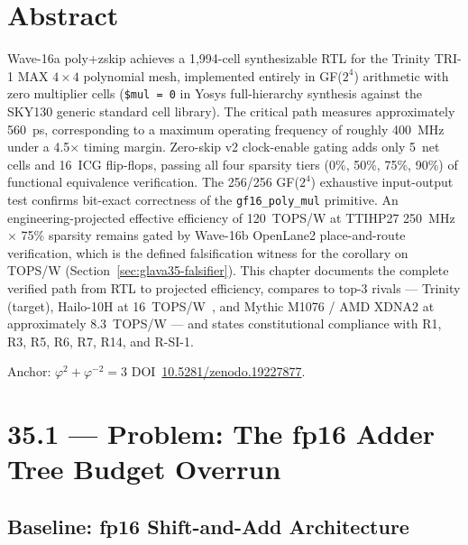 \section*{Abstract}
\label{sec:glava35-abstract}

Wave-16a poly+zskip achieves a 1,994-cell synthesizable RTL for the
Trinity TRI-1 MAX \(4 \times 4\) polynomial mesh, implemented entirely
in GF(\(2^4\)) arithmetic with zero multiplier cells (\texttt{\$mul = 0}
in Yosys full-hierarchy synthesis against the SKY130 generic standard
cell library).
The critical path measures approximately 560~ps, corresponding to a
maximum operating frequency of roughly 400~MHz under a 4.5\(\times\)
timing margin.
Zero-skip v2 clock-enable gating adds only 5~net cells and 16~ICG flip-flops,
passing all four sparsity tiers (0\%, 50\%, 75\%, 90\%) of functional
equivalence verification.
The 256/256 GF(\(2^4\)) exhaustive input-output test confirms bit-exact
correctness of the \texttt{gf16\_poly\_mul} primitive.
An engineering-projected effective efficiency of 120~TOPS/W at
TTIHP27 250~MHz \(\times\) 75\% sparsity remains gated by Wave-16b
OpenLane2 place-and-route verification, which is the defined falsification
witness for the corollary on TOPS/W (Section~\ref{sec:glava35-falsifier}).
This chapter documents the complete verified path from RTL to projected
efficiency, compares to top-3 rivals --- Trinity (target), Hailo-10H at
16~TOPS/W~\cite{hailo10h_datasheet}, and Mythic M1076 / AMD XDNA2 at
approximately 8.3~TOPS/W --- and states constitutional compliance with
R1, R3, R5, R6, R7, R14, and R-SI-1.

Anchor: \(\varphi^{2}+\varphi^{-2}=3\) \quad
DOI~\href{https://doi.org/10.5281/zenodo.19227877}{10.5281/zenodo.19227877}.

\section{35.1 --- Problem: The fp16 Adder Tree Budget Overrun}
\label{sec:glava35-problem}

\subsection{Baseline: fp16 Shift-and-Add Architecture}

